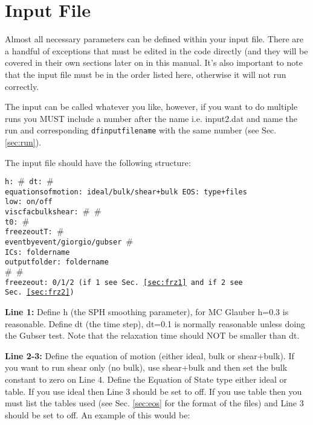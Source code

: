 \documentclass[article]{revtex4-1}
\newcommand{\code}[1]{\bigskip\noindent\begin{addmargin}[3em]{1em}\begin{linenumbers}\texttt{#1}\end{linenumbers}\end{addmargin}\bigskip}
\newcommand{\nocode}[1]{\texttt{#1}}
\begin{document}
\section{Input File}\label{sec:input}

Almost all necessary parameters can be defined within your input file.  There are a handful of exceptions that must be edited in the code directly (and they will be covered in their own sections later on in this manual.  It's also important to note that the input file must be in the order listed here, otherwise it will not run correctly.

The input can be called whatever you like, however, if you want to do multiple runs you MUST include a number after the name i.e. input2.dat and name the run and corresponding \nocode{dfinputfilename} with the same number (see Sec. \ref{sec:run}). 

The input file should have the following structure:

\code{h: $\#$	dt: $\#$ \\
equationsofmotion: ideal/bulk/shear+bulk EOS: type+files \\
low: on/off \\
viscfac\textunderscore bulk\textunderscore shear: $\#$ $\#$ \\
t0: $\#$ \\
freezeoutT: $\#$ \\
eventbyevent/giorgio/gubser $\#$ \\
ICs: foldername \\
output\textunderscore folder: foldername \\
$\#$ $\#$ \\
freezeout: 0/1/2 (if 1 see Sec.\ \ref{sec:frz1} and if 2 see Sec.\ \ref{sec:frz2}) 
}

{\bf Line 1: } Define h (the SPH smoothing parameter), for MC Glauber h=0.3 is reasonable.  Define dt (the time step), dt=0.1 is normally reasonable unless doing the Gubser test.  Note that the relaxation time should NOT be smaller than dt.

{\bf Line 2-3: } Define the equation of motion (either ideal, bulk or shear+bulk).  If you want to run shear only (no bulk), use shear+bulk and then set the bulk constant to zero on Line 4.  Define the Equation of State type either ideal or table. If you use ideal then Line 3 should be set to off.  If you use table then you must list the tables used (see Sec. \ref{sec:eos} for the format of the files) and Line 3 should be set to off. An example of this would be:
\end{document}

